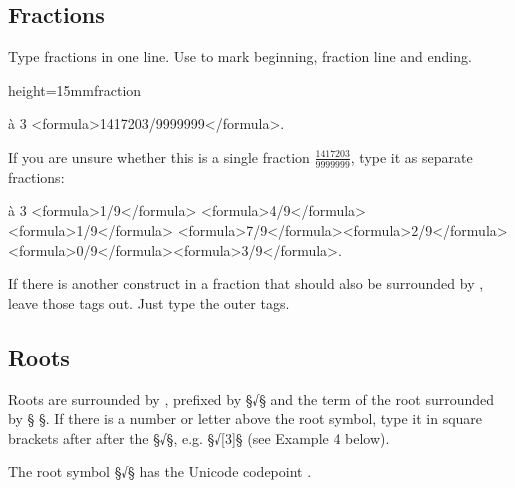 \tocspace
\subsection{Fractions}
\label{section fractions}

\begin{mainrule}
Type fractions in one line. Use  to mark beginning, fraction line and ending.
\end{mainrule}

\begin{sampleImageSmall}{height=15mm}{fraction}

\begin{typeMath}
à 3 <formula>1417203/9999999</formula>.
\end{typeMath}

If you are unsure whether this is a single fraction $\frac{1417203}{9999999}$, type it as separate fractions:

\begin{typeMath}
à 3 <formula>1/9</formula> <formula>4/9</formula> \lwr<formula>1/9</formula> <formula>7/9</formula>\lwr <formula>2/9</formula> <formula>0/9</formula>\lwr <formula>3/9</formula>.
\end{typeMath}

\end{sampleImageSmall}

\begin{note}
If there is another construct in a fraction that should also be surrounded by , leave those tags out. Just type the outer  tags.
\end{note}


\tocspace
\subsection{Roots}
\label{section roots}

\begin{mainrule}
Roots are surrounded by , prefixed by §√§ and the term of the root surrounded by §{ }§. If there is a number or letter above the root symbol, type it in square brackets after after the §√§, e.g. §√[3]§ (see Example 4 below).
\end{mainrule}

\begin{clarification}
The root symbol §√§ has the Unicode codepoint .
\end{clarification}

